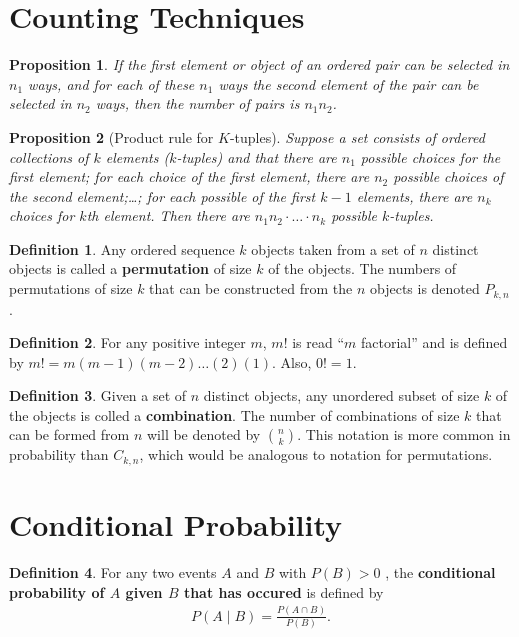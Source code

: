 \documentclass[a4paper]{report}
\theoremstyle{definition}
\newtheorem{definition}{Definition}
\theoremstyle{plain}
\newtheorem{prop}{Proposition}
\begin{document}
\section{Counting Techniques}
\begin{prop}
  If the first element or object of an ordered pair can be selected in $n_1$
  ways, and for each of these $n_1$ ways the second element of the pair can be
  selected in $n_2$ ways, then the number of pairs is $n_1n_2$.
\end{prop}

\begin{prop}[Product rule for $K$-tuples]
  Suppose a set consists of ordered collections of $k$ elements ($k$-tuples)
  and that there are $n_1$ possible choices for the first element; for each
  choice of the first element, there are $n_2$ possible choices of the second
  element;\dots; for each possible of the first $k-1$ elements, there are $n_k$
  choices for $k$th element. Then there are $n_1n_2\cdot\dots\cdot n_k$
  possible $k$-tuples.  
\end{prop}

\begin{definition}
  Any ordered sequence $k$ objects taken from a set of $n$ distinct objects is
  called a \textbf{permutation} of size $k$ of the objects.  The numbers of
  permutations of size $k$ that can be constructed from the $n$ objects is
  denoted $P_{k, n}$.
\end{definition}

\begin{definition} 
  For any positive integer $m$, $m!$ is read ``$m$ factorial'' and is defined
  by $m! = m(m-1)(m-2)\dots(2)(1)$. Also, $0! = 1$.
\end{definition}

\begin{definition}
  Given a set of $n$ distinct objects, any unordered subset of size $k$ of the
  objects is colled a \textbf{combination}. The number of combinations of size
  $k$ that can be formed from $n$ will be denoted by ${n \choose k}$. This
  notation is more common in probability
  than $C_{k,n}$, which would be analogous to notation for permutations.
\end{definition}
\section{Conditional Probability}

\begin{definition} 
  For any two events $A$ and $B$ with $P(B) > 0$ , the
  \textbf{conditional probability of $A$ given $B$ that has occured} is defined
  by \begin{align*} P(A\mid B) = \frac{P(A\cap B)}{P(B)}.  \end{align*}
\end{definition}
\end{document}
